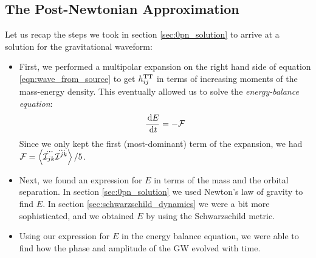 \subsection{The Post-Newtonian Approximation}
\label{sec:post_newtonian}

Let us recap the steps we took in section \ref{sec:0pn_solution} to arrive at a solution for the gravitational waveform:
\begin{itemize}
\item{First, we performed a multipolar expansion on the right hand side of equation \ref{eqn:wave_from_source} to get $h^{\mathrm{TT}}_{ij}$ in terms of increasing moments of the mass-energy density. This eventually allowed us to solve the \emph{energy-balance equation}:
\begin{equation}
\label{eqn:energy_balance}
\frac{\d E}{\d t} = -\mathcal{F}
\end{equation}
Since we only kept the first (most-dominant) term of the expansion, we had $\mathcal{F} = \left<\dddot{\mathcal{I}_{jk}}\dddot{\mathcal{I}^{jk}}\right>/5$.}
\item{Next, we found an expression for $E$ in terms of the mass and the orbital separation. In section \ref{sec:0pn_solution} we used Newton's law of gravity to find $E$. In section \ref{sec:schwarzschild_dynamics} we were a bit more sophisticated, and we obtained $E$ by using the Schwarzschild metric.}
\item{Using our expression for $E$ in the energy balance equation, we were able to find how the phase and amplitude of the \ac{GW} evolved with time.}
\end{itemize}

